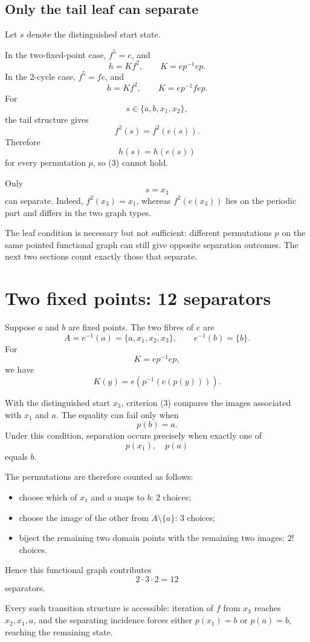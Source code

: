 \documentclass[10pt]{article}
\begin{document}
\subsection{Only the tail leaf can separate}

Let $s$ denote the distinguished start state.

In the two-fixed-point case, $f^5=e$, and
\[
h=Kf^2,\qquad K=ep^{-1}ep.
\]
In the $2$-cycle case, $f^5=fe$, and
\[
h=Kf^2,\qquad K=ep^{-1}fep.
\]
For
\[
s\in\{a,b,x_1,x_2\},
\]
the tail structure gives
\[
f^2(s)=f^2(e(s)).
\]
Therefore
\[
h(s)=h(e(s))
\]
for every permutation $p$, so (3) cannot hold.

Only
\[
s=x_3
\]
can separate. Indeed, $f^2(x_3)=x_1$, whereas $f^2(e(x_3))$ lies on the periodic part and differs in the two graph types.

The leaf condition is necessary but not sufficient: different permutations $p$ on the same pointed functional graph can still give opposite separation outcomes. The next two sections count exactly those that separate.

\section{Two fixed points: 12 separators}

Suppose $a$ and $b$ are fixed points. The two fibres of $e$ are
\[
A=e^{-1}(a)=\{a,x_1,x_2,x_3\},
\qquad
e^{-1}(b)=\{b\}.
\]
For
\[
K=ep^{-1}ep,
\]
we have
\[
K(y)=e\!\left(p^{-1}(e(p(y)))\right).
\]

With the distinguished start $x_3$, criterion (3) compares the images associated with $x_1$ and $a$. The equality can fail only when
\[
p(b)=a.
\]
Under this condition, separation occurs precisely when exactly one of
\[
p(x_1),\quad p(a)
\]
equals $b$.

The permutations are therefore counted as follows:
\begin{itemize}
\item choose which of $x_1$ and $a$ maps to $b$: $2$ choices;
\item choose the image of the other from $A\setminus\{a\}$: $3$ choices;
\item biject the remaining two domain points with the remaining two images: $2!$ choices.
\end{itemize}
Hence this functional graph contributes
\[
2\cdot3\cdot2=12
\]
separators.

Every such transition structure is accessible: iteration of $f$ from $x_3$ reaches $x_2,x_1,a$, and the separating incidence forces either $p(x_1)=b$ or $p(a)=b$, reaching the remaining state.
\end{document}
